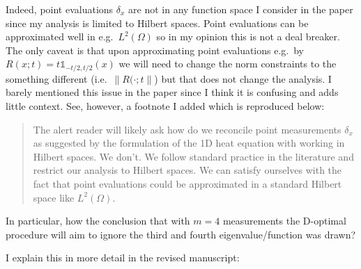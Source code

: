 \AR Indeed, point evaluations $\delta_x$ are not in any function space
I consider in the paper since my analysis is limited to Hilbert
spaces. Point evaluations can be approximated well in
e.g.~$L^2(\Omega)$ so in my opinion this is not a deal breaker. The
only caveat is that upon approximating point evaluations e.g.~by
$R(x;t) = t\mathbb{1}_{-t/2, t/2}(x)$ we will need to change the norm
constraints to the something different (i.e.~$\|R(\cdot;t\|$) but that
does not change the analysis. I barely mentioned this issue in the
paper since I think it is confusing and adds little context. See,
however, a footnote I added which is reproduced below:

\begin{quote}
  The alert reader will likely ask how do we reconcile point
  measurements $\delta_x$ as suggested by the formulation of the 1D
  heat equation with working in Hilbert spaces. We don't. We follow
  standard practice in the literature and restrict our analysis to
  Hilbert spaces. We can satisfy ourselves with the fact that point
  evaluations could be approximated in a standard Hilbert space like
  $L^2(\Omega)$.
\end{quote}
  
\RC In particular, how the conclusion that with $m = 4$ measurements
the D-optimal procedure will aim to ignore the third and fourth
eigenvalue/function was drawn?

\AR I explain this in more detail in the revised manuscript:


